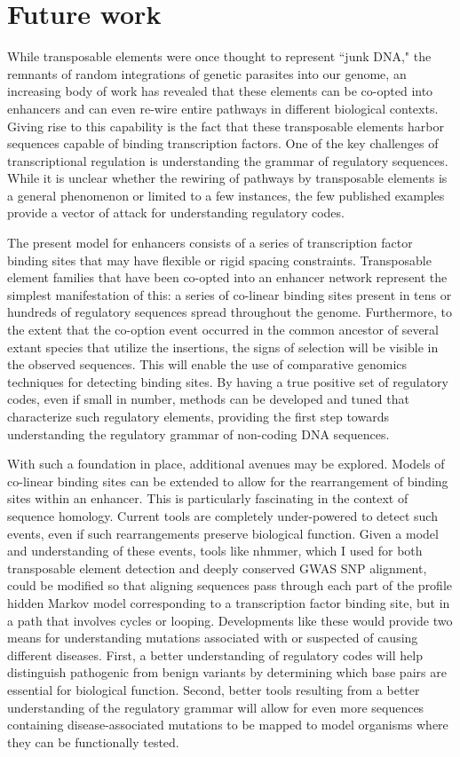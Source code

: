 \section{Future work}

While transposable elements were once thought to represent ``junk DNA," the remnants of random integrations of genetic parasites into our genome, an increasing body of work has revealed that these elements can be co-opted into enhancers and can even re-wire entire pathways in different biological contexts. Giving rise to this capability is the fact that these transposable elements harbor sequences capable of binding transcription factors. One of the key challenges of transcriptional regulation is understanding the grammar of regulatory sequences. While it is unclear whether the rewiring of pathways by transposable elements is a general phenomenon or limited to a few instances, the few published examples provide a vector of attack for understanding regulatory codes.

The present model for enhancers consists of a series of transcription factor binding sites that may have flexible or rigid spacing constraints. Transposable element families that have been co-opted into an enhancer network represent the simplest manifestation of this: a series of co-linear binding sites present in tens or hundreds of regulatory sequences spread throughout the genome. Furthermore, to the extent that the co-option event occurred in the common ancestor of several extant species that utilize the insertions, the signs of selection will be visible in the observed sequences. This will enable the use of comparative genomics techniques for detecting binding sites. By having a true positive set of regulatory codes, even if small in number, methods can be developed and tuned that characterize such regulatory elements, providing the first step towards understanding the regulatory grammar of non-coding DNA sequences.

With such a foundation in place, additional avenues may be explored. Models of co-linear binding sites can be extended to allow for the rearrangement of binding sites within an enhancer. This is particularly fascinating in the context of sequence homology. Current tools are completely under-powered to detect such events, even if such rearrangements preserve biological function. Given a model and understanding of these events, tools like nhmmer, which I used for both transposable element detection and deeply conserved GWAS SNP alignment, could be modified so that aligning sequences pass through each part of the profile hidden Markov model corresponding to a transcription factor binding site, but in a path that involves cycles or looping. Developments like these would provide two means for understanding mutations associated with or suspected of causing different diseases. First, a better understanding of regulatory codes will help distinguish pathogenic from benign variants by determining which base pairs are essential for biological function. Second, better tools resulting from a better understanding of the regulatory grammar will allow for even more sequences containing disease-associated mutations to be mapped to model organisms where they can be functionally tested.

